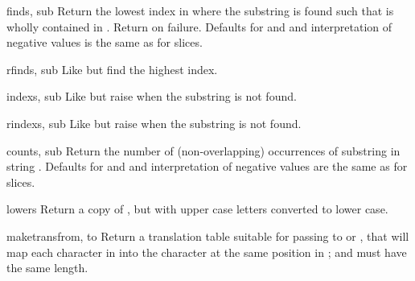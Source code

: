\begin{funcdesc}{find}{s, sub}
  Return the lowest index in  where the substring  is
  found such that  is wholly contained in
  .  Return  on failure.
  Defaults for  and  and interpretation of
  negative values is the same as for slices.
\end{funcdesc}

\begin{funcdesc}{rfind}{s, sub}
  Like  but find the highest index.
\end{funcdesc}

\begin{funcdesc}{index}{s, sub}
  Like  but raise  when the
  substring is not found.
\end{funcdesc}

\begin{funcdesc}{rindex}{s, sub}
  Like  but raise  when the
  substring is not found.
\end{funcdesc}

\begin{funcdesc}{count}{s, sub}
  Return the number of (non-overlapping) occurrences of substring
   in string .
  Defaults for  and  and interpretation of
  negative values are the same as for slices.
\end{funcdesc}

\begin{funcdesc}{lower}{s}
  Return a copy of , but with upper case letters converted to
  lower case.
\end{funcdesc}

\begin{funcdesc}{maketrans}{from, to}
  Return a translation table suitable for passing to
   or , that will map
  each character in  into the character at the same position
  in ;  and  must have the same length.

\end{funcdesc}

